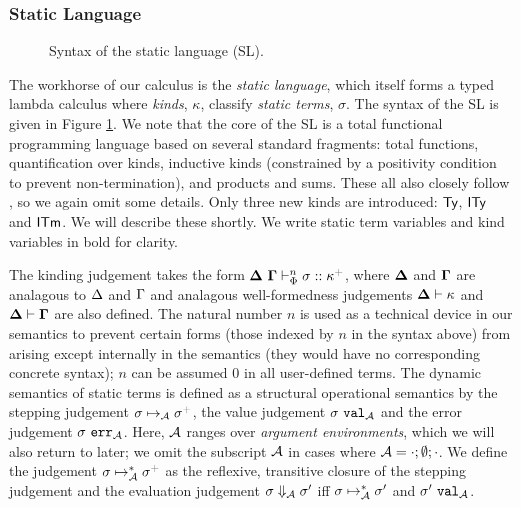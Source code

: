 \documentclass{llncs}
\newcommand{\moutput}{^{\color{gray}+}}
\begin{document}
\vspace{-10px}
\subsubsection{Static Language}
\begin{figure}[t]

\caption{Syntax of the static language (SL).}
\vspace{-10px}
\label{syntax-SL}
\end{figure}
The workhorse of our calculus is the \emph{static language}, which itself forms a typed lambda calculus where 
\emph{kinds}, $\kappa$, classify \emph{static terms}, $\sigma$.  The syntax of the SL is given in Figure \ref{syntax-SL}. We note that the core of the SL is a total functional programming language based  on several standard fragments: total functions, quantification over kinds, inductive kinds (constrained by a positivity condition to prevent non-termination), and products and sums. These all also closely follow \cite{pfpl}, so we again omit some details. Only three new kinds are introduced: ${\sf Ty}$, ${\sf ITy}$ and ${\sf ITm}$. We will describe these shortly. We write static term variables and kind variables in bold for clarity.

The kinding judgement takes the form $\sofkX{\st}{\kappa\moutput}$, where $\boldsymbol\Delta$ and $\boldsymbol\Gamma$ are analagous to $\Delta$ and $\Gamma$ and analagous well-formedness judgements $\boldsymbol\Delta \vdash \kappa$ and $\boldsymbol\Delta \vdash \boldsymbol\Gamma$ are also defined. The natural number $n$ is used as a technical device in our semantics to prevent certain forms (those indexed by $n$ in the syntax above) from arising except internally in the semantics (they would have no corresponding concrete syntax); $n$ can be assumed $0$ in all user-defined terms. The dynamic semantics of static terms is defined as a structural operational semantics by the stepping judgement $\sstep{\st}{\argEnv}{\st\moutput}$, the value judgement $\sigma~\mathtt{val}_{\mathcal{A}}$ and the error judgement $\sigma~\mathtt{err}_{\mathcal{A}}$. Here, $\mathcal{A}$ ranges over \emph{argument environments}, which we will also return to later; we omit the subscript $\mathcal{A}$ in cases where $\mathcal{A} = \cdot; \emptyset; \cdot$. We define the judgement $\smanystep{\st}{\argEnv}{\st\moutput}$ as the reflexive, transitive closure of the stepping judgement and the evaluation judgement $\sigma \Downarrow_{\mathcal{A}} \sigma'$ iff $\sigma \mapsto_{\mathcal{A}}^{*} \sigma'$ and $\sigma'~\mathtt{val}_{\mathcal{A}}$. %
\end{document}
